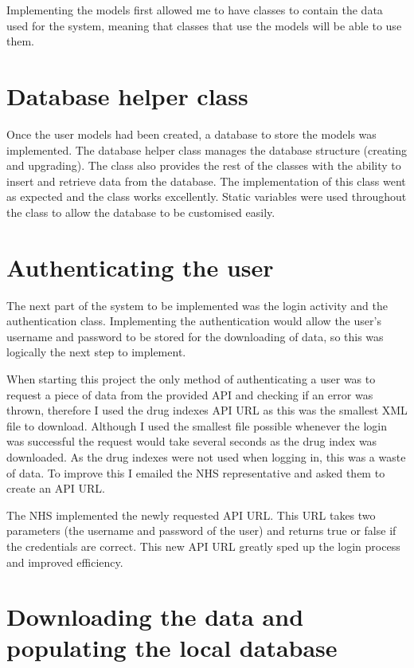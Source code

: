 Implementing the models first allowed me to have classes to contain the data used for the system, meaning that classes that use the models will be able to use them.

\section{Database helper class}

Once the user models had been created, a database to store the models was implemented. The database helper class manages the database structure (creating and upgrading). The class also provides the rest of the classes with the ability to insert and retrieve data from the database. The implementation of this class went as expected and the class works excellently. Static variables were used throughout the class to allow the database to be customised easily.

\section{Authenticating the user}
The next part of the system to be implemented was the login activity and the authentication class. Implementing the authentication would allow the user’s username and password to be stored for the downloading of data, so this was logically the next step to implement.

When starting this project the only method of authenticating a user was to request a piece of data from the provided API and checking if an error was thrown, therefore I used the drug indexes API URL as this was the smallest XML file \cite{xml} to download. Although I used the smallest file possible whenever the login was successful the request would take several seconds as the drug index was downloaded. As the drug indexes were not used when logging in, this was a waste of data. To improve this I emailed the NHS representative and asked them to create an API URL.

The NHS \cite{nhs_website} implemented the newly requested API URL. This URL takes two parameters (the username and password of the user) and returns true or false if the credentials are correct. This new API URL greatly sped up the login process and improved efficiency.

\section{Downloading the data and populating the local database}

